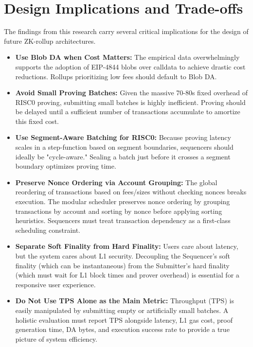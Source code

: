 \section{Design Implications and Trade-offs}
\label{sec:design_implications}
The findings from this research carry several critical implications for the design of future ZK-rollup architectures.
\begin{itemize}
    \item \textbf{Use Blob DA when Cost Matters:} The empirical data overwhelmingly supports the adoption of EIP-4844 blobs over calldata to achieve drastic cost reductions. Rollups prioritizing low fees should default to Blob DA.
    \item \textbf{Avoid Small Proving Batches:} Given the massive 70-80s fixed overhead of RISC0 proving, submitting small batches is highly inefficient. Proving should be delayed until a sufficient number of transactions accumulate to amortize this fixed cost.
    \item \textbf{Use Segment-Aware Batching for RISC0:} Because proving latency scales in a step-function based on segment boundaries, sequencers should ideally be "cycle-aware." Sealing a batch just before it crosses a segment boundary optimizes proving time.
    \item \textbf{Preserve Nonce Ordering via Account Grouping:} The global reordering of transactions based on fees/sizes without checking nonces breaks execution. The modular scheduler preserves nonce ordering by grouping transactions by account and sorting by nonce before applying sorting heuristics. Sequencers must treat transaction dependency as a first-class scheduling constraint.
    \item \textbf{Separate Soft Finality from Hard Finality:} Users care about latency, but the system cares about L1 security. Decoupling the Sequencer's soft finality (which can be instantaneous) from the Submitter's hard finality (which must wait for L1 block times and prover overhead) is essential for a responsive user experience.
    \item \textbf{Do Not Use TPS Alone as the Main Metric:} Throughput (TPS) is easily manipulated by submitting empty or artificially small batches. A holistic evaluation must report TPS alongside latency, L1 gas cost, proof generation time, DA bytes, and execution success rate to provide a true picture of system efficiency.
\end{itemize}
